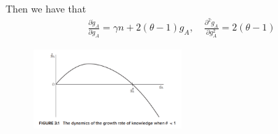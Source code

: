 \documentclass[../main.tex]{subfiles}
\begin{document}
        Then we have that
        \begin{align}
            \frac{\partial \dot g_A}{\partial g_A}
            = \gamma n + 2 (\theta - 1) g_A,
            \quad
            \frac{\partial^2 \dot g_A}{\partial g_A^2}
            = 2 (\theta - 1)
        \end{align}
        
        \begin{figure}[ht!]
            \centering
            \includegraphics[width=0.5\textwidth]{subfile/attachments/3.1-dynamics-A-theta-le-0.png}
        \end{figure}
        
    
\end{document}
